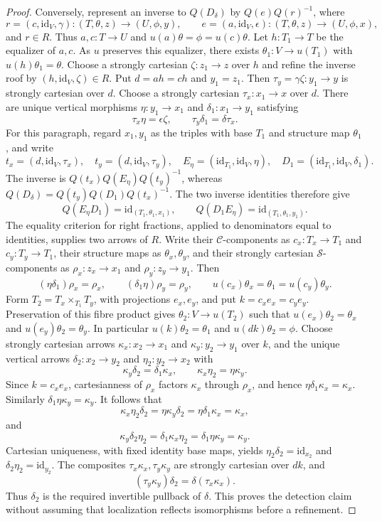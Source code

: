 \begin{proof}
\medskip\noindent
Conversely, represent an inverse to $Q(D_\delta)$ by $Q(e)Q(r)^{-1}$, where
$$
r = (c,\text{id}_V,\gamma) : (T,\theta,z) \to (U,\phi,y),\qquad
e = (a,\text{id}_V,\epsilon) : (T,\theta,z) \to (U,\phi,x),
$$
and $r \in R$. Thus $a,c : T \to U$ and
$u(a)\theta = \phi = u(c)\theta$.
Let $h : T_1 \to T$ be the equalizer of $a,c$.
As $u$ preserves this equalizer, there exists
$\theta_1 : V \to u(T_1)$ with $u(h)\theta_1 = \theta$.
Choose a strongly cartesian $\zeta : z_1 \to z$ over $h$ and refine
the inverse roof by $(h,\text{id}_V,\zeta) \in R$.
Put $d = ah = ch$ and $y_1 = z_1$.
Then $\tau_y = \gamma\zeta : y_1 \to y$ is strongly cartesian over $d$.
Choose a strongly cartesian $\tau_x : x_1 \to x$ over $d$.
There are unique vertical morphisms
$\eta : y_1 \to x_1$ and $\delta_1 : x_1 \to y_1$ satisfying
$$
\tau_x\eta = \epsilon\zeta,\qquad
\tau_y\delta_1 = \delta\tau_x.
$$
For this paragraph, regard $x_1,y_1$ as the triples with base $T_1$
and structure map $\theta_1$, and write
$$
t_x = (d,\text{id}_V,\tau_x),\quad
t_y = (d,\text{id}_V,\tau_y),\quad
E_\eta = (\text{id}_{T_1},\text{id}_V,\eta),\quad
D_1 = (\text{id}_{T_1},\text{id}_V,\delta_1).
$$
The inverse is $Q(t_x)Q(E_\eta)Q(t_y)^{-1}$, whereas
$Q(D_\delta) = Q(t_y)Q(D_1)Q(t_x)^{-1}$.
The two inverse identities therefore give
$$
Q(E_\eta D_1) = \text{id}_{(T_1,\theta_1,x_1)},\qquad
Q(D_1 E_\eta) = \text{id}_{(T_1,\theta_1,y_1)}.
$$
The equality criterion for right fractions, applied to denominators
equal to identities, supplies two arrows of $R$. Write their
$\mathcal{C}$-components as $c_x : T_x \to T_1$ and
$c_y : T_y \to T_1$, their structure maps as $\theta_x,\theta_y$, and
their strongly cartesian $\mathcal{S}$-components as
$\rho_x : z_x \to x_1$ and $\rho_y : z_y \to y_1$.
Then
$$
(\eta\delta_1)\rho_x = \rho_x,\qquad
(\delta_1\eta)\rho_y = \rho_y,\qquad
u(c_x)\theta_x = \theta_1 = u(c_y)\theta_y.
$$
Form $T_2 = T_x \times_{T_1} T_y$, with projections $e_x,e_y$, and put
$k = c_xe_x = c_ye_y$. Preservation of this fibre product gives
$\theta_2 : V \to u(T_2)$ such that
$u(e_x)\theta_2 = \theta_x$ and $u(e_y)\theta_2 = \theta_y$.
In particular $u(k)\theta_2 = \theta_1$ and $u(dk)\theta_2 = \phi$.
Choose strongly cartesian arrows $\kappa_x : x_2 \to x_1$ and
$\kappa_y : y_2 \to y_1$ over $k$, and the unique vertical arrows
$\delta_2 : x_2 \to y_2$ and $\eta_2 : y_2 \to x_2$ with
$$
\kappa_y\delta_2 = \delta_1\kappa_x,\qquad
\kappa_x\eta_2 = \eta\kappa_y.
$$
Since $k = c_xe_x$, cartesianness of $\rho_x$ factors $\kappa_x$
through $\rho_x$, and hence $\eta\delta_1\kappa_x = \kappa_x$.
Similarly $\delta_1\eta\kappa_y = \kappa_y$.
It follows that
$$
\kappa_x\eta_2\delta_2
= \eta\kappa_y\delta_2
= \eta\delta_1\kappa_x
= \kappa_x,
$$
and
$$
\kappa_y\delta_2\eta_2
= \delta_1\kappa_x\eta_2
= \delta_1\eta\kappa_y
= \kappa_y.
$$
Cartesian uniqueness, with fixed identity base maps, yields
$\eta_2\delta_2 = \text{id}_{x_2}$ and
$\delta_2\eta_2 = \text{id}_{y_2}$.
The composites $\tau_x\kappa_x,\tau_y\kappa_y$ are strongly cartesian
over $dk$, and
$$
(\tau_y\kappa_y)\delta_2 = \delta(\tau_x\kappa_x).
$$
Thus $\delta_2$ is the required invertible pullback of $\delta$.
This proves the detection claim without assuming that localization
reflects isomorphisms before a refinement.


\end{proof}
